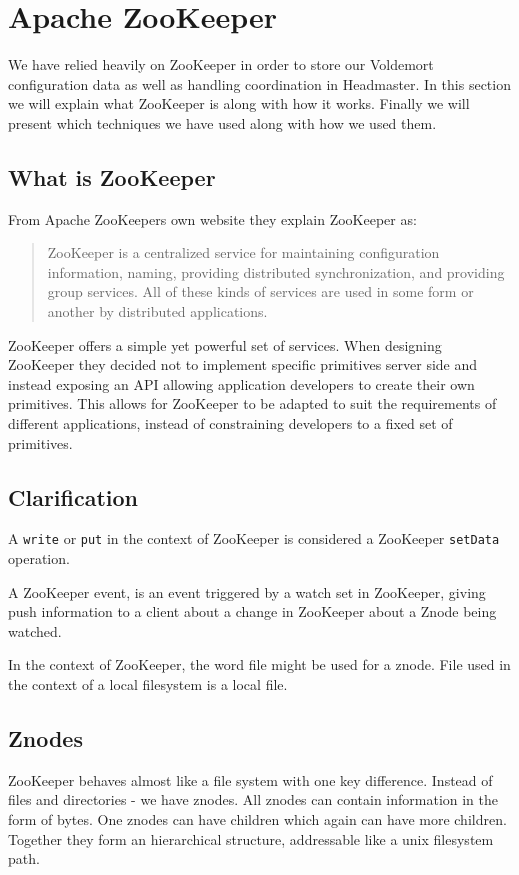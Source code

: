 \clearpage
\section{Apache ZooKeeper}
\label{sec:zookeeper}
We have relied heavily on ZooKeeper in order to store our Voldemort configuration data as well as handling coordination in Headmaster. In this section we will explain what ZooKeeper is along with how it works. Finally we will present which techniques we have used along with how we used them. 

\subsection{What is ZooKeeper}
From Apache ZooKeepers own website\cite{zookeeper} they explain ZooKeeper as:

\blockquote{ZooKeeper is a centralized service for maintaining configuration information, naming, providing distributed synchronization, and providing group services. All of these kinds of services are used in some form or another by distributed applications.}

ZooKeeper offers a simple yet powerful set of services. When designing ZooKeeper they decided not to implement specific primitives server side and instead exposing an API allowing application developers to create their own primitives. This allows for ZooKeeper to be adapted to suit the requirements of different applications, instead of constraining developers to a fixed set of primitives. 

\subsection{Clarification}
A \texttt{write} or \texttt{put} in the context of ZooKeeper is considered a ZooKeeper \texttt{setData} operation.

A ZooKeeper event, is an event triggered by a watch set in ZooKeeper, giving push information to a client about a change in ZooKeeper about a Znode being watched.

In the context of ZooKeeper, the word file might be used for a znode. File used in the context of a local filesystem is a local file.

\subsection{Znodes}
ZooKeeper behaves almost like a file system with one key difference. Instead of files and directories - we have znodes. All znodes can contain information in the form of bytes. One znodes can have children which again can have more children. Together they form an hierarchical structure, addressable like a unix filesystem path. 

